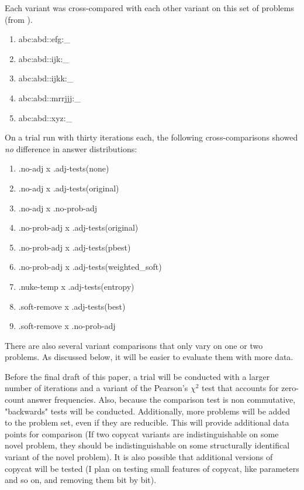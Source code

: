 \documentclass[a4paper]{article}
\begin{document}
        Each variant was cross-compared with each other variant on this set of problems (from \cite{fluidconcepts}).
        \begin{enumerate}
            \item abc:abd::efg:\_	
            \item abc:abd::ijk:\_	
            \item abc:abd::ijkk:\_	
            \item abc:abd::mrrjjj:\_	
            \item abc:abd::xyz:\_
        \end{enumerate}

        On a trial run with thirty iterations each, the following cross-comparisons showed \emph{no} difference in answer distributions:
        \begin{enumerate}
            \item .no-adj x	.adj-tests(none)
            \item .no-adj x .adj-tests(original)
            \item .no-adj x .no-prob-adj	
            \item .no-prob-adj x .adj-tests(original)
            \item .no-prob-adj x .adj-tests(pbest)
            \item .no-prob-adj x .adj-tests(weighted\_soft)
            \item .nuke-temp x .adj-tests(entropy)
            \item .soft-remove x .adj-tests(best)
            \item .soft-remove x .no-prob-adj	
        \end{enumerate}

        There are also several variant comparisons that only vary on one or two problems. 
        As discussed below, it will be easier to evaluate them with more data.

        Before the final draft of this paper, a trial will be conducted with a larger number of iterations and a variant of the Pearson's $\chi^2$ test that accounts for zero-count answer frequencies.
        Also, because the comparison test is non commutative, "backwards" tests will be conducted.
        Additionally, more problems will be added to the problem set, even if they are reducible. 
        This will provide additional data points for comparison (If two copycat variants are indistinguishable on some novel problem, they should be indistinguishable on some structurally identifical variant of the novel problem).
        It is also possible that additional versions of copycat will be tested (I plan on testing small features of copycat, like parameters and so on, and removing them bit by bit). 
\end{document}
